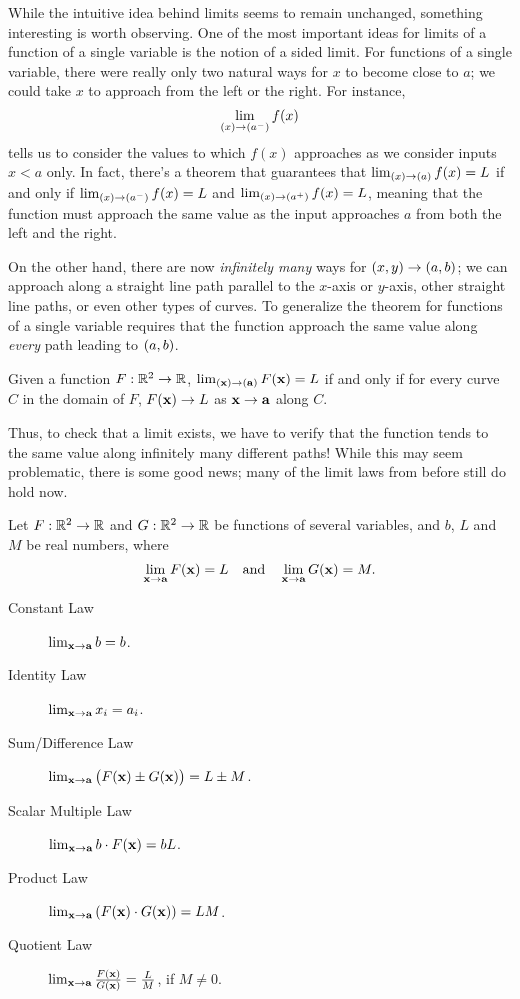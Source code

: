 \documentclass{ximera}
\begin{document}
While the intuitive idea behind limits seems to remain unchanged, something interesting is worth observing.  One of the most important ideas for limits of a function of a single variable is the notion of a sided limit.  For functions of a single variable, there were really only two natural ways for $x$ to become close to $a$; we could take $x$ to approach from the left or the right.  For instance,
\[
\lim_{\left(x\right) \to \left(a^-\right)}f(x) 
\]
tells us to consider the values to which $f(x)$ approaches as we consider inputs $x<a$ only.  In fact, there's a theorem that guarantees that $\lim_{\left(x\right) \to \left(a\right)} f(x) = L$ if and only if $\lim_{\left(x\right) \to \left(a^-\right)}f(x) =L$ and $\lim_{\left(x\right) \to \left(a^+\right)}f(x) =L$, meaning that the function must approach the same value as the input approaches $a$ from both the left and the right.

On the other hand, there are now \emph{infinitely many} ways for $\left(x,y\right) \to \left(a,b\right)$; we can approach along a straight line path parallel to the $x$-axis or $y$-axis, other straight line paths, or even other types of curves.  To generalize the theorem for functions of a single variable requires that the function approach the same value along \emph{every} path leading to $\left(a,b\right)$.

\begin{theorem}
Given a function $F:\mathbb R^2\to\mathbb R$, $\lim_{\left(\mathbf{x}\right) \to \left(\mathbf{a}\right)}F(\mathbf{x}) = L$ if and only if for every curve $C$ in the domain of $F$, $F(\mathbf{x}) \to L$ as $\mathbf{x} \to \mathbf{a}$ along $C$.
\end{theorem}

Thus, to check that a limit exists, we have to verify that the function tends to the same value along infinitely many different paths!  While this may seem problematic, there is some good news; many of the limit laws from before still do hold now.

\begin{theorem}
  Let $F:\mathbb R^2\to \mathbb R$ and $G:\mathbb R^2\to \mathbb R$ be functions of several
  variables, and $b$, $L$ and $M$ be real numbers, where
  \[
  \lim_{\mathbf{x}\to\mathbf{a}}F(\mathbf{x}) = L \quad \text{and}\quad \lim_{\mathbf{x}\to\mathbf{a}} G(\mathbf{x}) = M.
  \]
\begin{description}
\item[Constant Law] $\lim_{\mathbf{x}\to \mathbf{a}} b = b$.
\item[Identity Law] $\lim_{\mathbf{x}\to \mathbf{a}} x_i = a_i$.
\item[Sum/Difference Law] $\lim_{\mathbf{x}\to \mathbf{a}}\big(F(\mathbf{x})\pm G(\mathbf{x})\big) = L\pm M$.
\item[Scalar Multiple Law] $\lim_{\mathbf{x}\to \mathbf{a}} b\cdot F(\mathbf{x}) = bL$.
\item[Product Law] $\lim_{\mathbf{x}\to \mathbf{a}} \left(F(\mathbf{x})\cdot G(\mathbf{x})\right) = LM$.
\item[Quotient Law] $\lim_{\mathbf{x}\to \mathbf{a}} \frac{F(\mathbf{x})}{G(\mathbf{x})} = \frac{L}{M}$, if $M\neq 0$.
\end{description}
\end{theorem}
\end{document}
